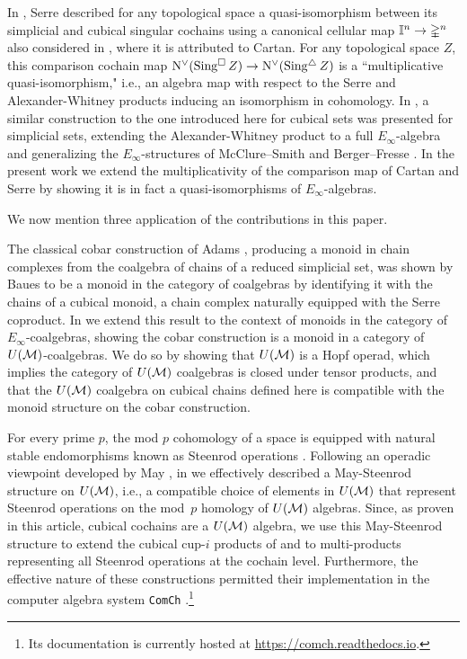 In \cite[p. 442]{serre1951homologie}, Serre described for any topological space a quasi-isomorphism between its simplicial and cubical singular cochains using a canonical cellular map $\mathbb{I}^n \to \mathbb{\Delta}^n$ also considered in \cite[p.199]{eilenberg1953acyclic}, where it is attributed to Cartan.
For any topological space $Z$, this comparison cochain map $\operatorname{N^{\vee}}(\operatorname{Sing^{\square}} Z) \to \operatorname{N^{\vee}}(\operatorname{Sing^{\triangle}} Z)$ is a ``multiplicative quasi-isomorphism," i.e., an algebra map with respect to the Serre and Alexander-Whitney products inducing an isomorphism in cohomology.
In \cite{medina2020prop1}, a similar construction to the one introduced here for cubical sets was presented for simplicial sets, extending the Alexander-Whitney product to a full $E_\infty$-algebra and generalizing the $E_\infty$-structures of McClure--Smith \cite{mcclure2003multivariable} and Berger--Fresse \cite{berger2004combinatorial}.
In the present work we extend the multiplicativity of the comparison map of Cartan and Serre by showing it is in fact a quasi-isomorphisms of $E_\infty$-algebras.

We now mention three application of the contributions in this paper.

The classical cobar construction of Adams \cite{adams1956cobar}, producing a monoid in chain complexes from the coalgebra of chains of a reduced simplicial set, was shown by Baues \cite{baues1998hopf} to be a monoid in the category of coalgebras by identifying it with the chains of a cubical monoid, a chain complex naturally equipped with the Serre coproduct.
In \cite{medina2021cobar} we extend this result to the context of monoids in the category of $E_\infty$-coalgebras, showing the cobar construction is a monoid in a category of $U(\mathcal{M})$-coalgebras.
We do so by showing that $U(\mathcal{M})$ is a Hopf operad, which implies the category of $U(\mathcal{M})$ coalgebras is closed under tensor products, and that the $U(\mathcal{M})$ coalgebra on cubical chains defined here is compatible with the monoid structure on the cobar construction.

For every prime $p$, the mod $p$ cohomology of a space is equipped with natural stable endomorphisms known as Steenrod operations \cite{steenrod1962cohomology}.
Following an operadic viewpoint developed by May \cite{may1970general}, in \cite{medina2020maysteenrod} we effectively described a May-Steenrod structure on $U(\mathcal{M})$, i.e., a compatible choice of elements in $U(\mathcal{M})$ that represent Steenrod operations on the mod~$p$ homology of $U(\mathcal{M})$ algebras.
Since, as proven in this article, cubical cochains are a $U(\mathcal{M})$ algebra, we use this May-Steenrod structure to extend the cubical cup-$i$ products of \cite{kadeishvili2003cupi} and \cite{pilarczyk2016cubical} to multi-products representing all Steenrod operations at the cochain level.
Furthermore, the effective nature of these constructions permitted their implementation in the computer algebra system \texttt{ComCh} \cite{medina2021computer}.\footnote{Its documentation is currently hosted at \url{https://comch.readthedocs.io}.}

